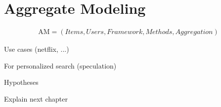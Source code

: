 
\section{Aggregate Modeling}

\begin{eqnarray}
  \mathrm{AM} = (Items, Users, Framework, Methods, Aggregation)
\end{eqnarray}




Use cases (netflix, ...)

For personalized search (speculation)

Hypotheses

Explain next chapter


